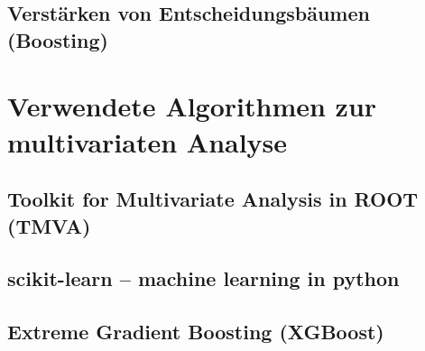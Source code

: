 
\subsection{Verst\"arken von Entscheidungsb\"aumen (Boosting)}
\label{ch:Algorithmen:subsec:Boosting}

\section{Verwendete Algorithmen zur multivariaten Analyse}
\label{ch:Algorithmen:subsec:Implementationen}

\subsection{Toolkit for Multivariate Analysis in ROOT (TMVA)}
\label{ch:Algorithmen:subsec:TMVA}

\subsection{scikit-learn -- machine learning in python}
\label{ch:Algorithmen:subsec:sklearn}

\subsection{Extreme Gradient Boosting (XGBoost)}
\label{ch:Algorithmen:subsec:XGB}
